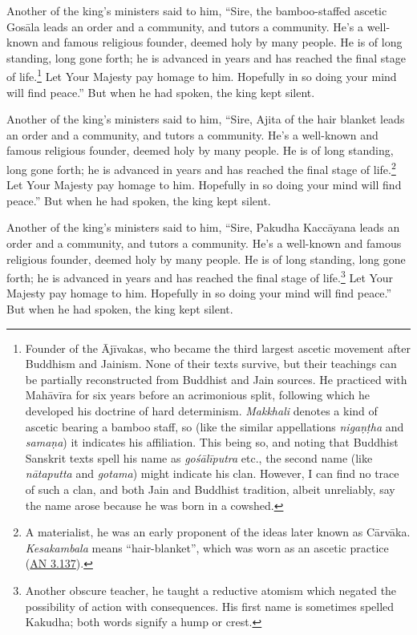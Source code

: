 \documentclass[12pt,openany]{book}%
\begin{document}
Another of the king’s ministers said to him, “Sire, the bamboo-staffed ascetic \textsanskrit{Gosāla} leads an order and a community, and tutors a community. He’s a well-known and famous religious founder, deemed holy by many people. He is of long standing, long gone forth; he is advanced in years and has reached the final stage of life.\footnote{Founder of the \textsanskrit{Ājīvakas}, who became the third largest ascetic movement after Buddhism and Jainism. None of their texts survive, but their teachings can be partially reconstructed from Buddhist and Jain sources. He practiced with \textsanskrit{Mahāvīra} for six years before an acrimonious split, following which he developed his doctrine of hard determinism. \textit{Makkhali} denotes a kind of ascetic bearing a bamboo staff, so (like the similar appellations \textit{\textsanskrit{nigaṇṭha}} and \textit{\textsanskrit{samaṇa}}) it indicates his affiliation. This being so, and noting that Buddhist Sanskrit texts spell his name as \textit{\textsanskrit{gośālīputra}} etc., the second name (like \textit{\textsanskrit{nātaputta}} and \textit{gotama}) might indicate his clan. However, I can find no trace of such a clan, and both Jain and Buddhist tradition, albeit unreliably, say the name arose because he was born in a cowshed. } Let Your Majesty pay homage to him. Hopefully in so doing your mind will find peace.” But when he had spoken, the king kept silent. 

Another of the king’s ministers said to him, “Sire, Ajita of the hair blanket leads an order and a community, and tutors a community. He’s a well-known and famous religious founder, deemed holy by many people. He is of long standing, long gone forth; he is advanced in years and has reached the final stage of life.\footnote{A materialist, he was an early proponent of the ideas later known as \textsanskrit{Cārvāka}. \textit{Kesakambala} means “hair-blanket”, which was worn as an ascetic practice (\href{https://suttacentral.net/an3.137/en/sujato}{AN 3.137}). } Let Your Majesty pay homage to him. Hopefully in so doing your mind will find peace.” But when he had spoken, the king kept silent. 

Another of the king’s ministers said to him, “Sire, Pakudha \textsanskrit{Kaccāyana} leads an order and a community, and tutors a community. He’s a well-known and famous religious founder, deemed holy by many people. He is of long standing, long gone forth; he is advanced in years and has reached the final stage of life.\footnote{Another obscure teacher, he taught a reductive atomism which negated the possibility of action with consequences. His first name is sometimes spelled Kakudha; both words signify a hump or crest. } Let Your Majesty pay homage to him. Hopefully in so doing your mind will find peace.” But when he had spoken, the king kept silent. 
\end{document}

